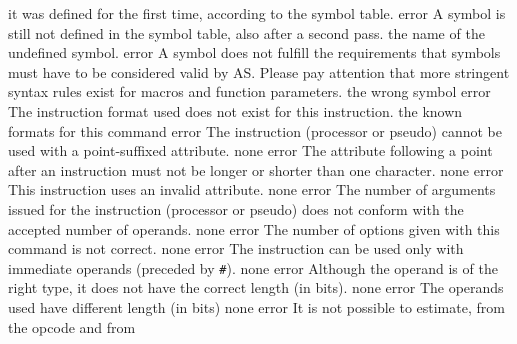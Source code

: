 \documentclass[12pt,twoside]{report}
\newcommand{\tty}[1]{{\tt #1}}
\begin{document}
\begin{description}
{                it was defined for the first time, according to the symbol
                table.}
               {error}
               {A symbol is still not defined in the symbol table, also
                after a second pass.}
               {the name of the undefined symbol.}
               {error}
               {A symbol does not fulfill the requirements that symbols
                must have to be considered valid by AS. Please pay
                attention that more stringent syntax rules exist for
                macros and function parameters.}
               {the wrong symbol}
               {error}
               {The instruction format used does not exist for this
                instruction.}
               {the known formats for this command}
               {error}
               {The instruction (processor or pseudo) cannot be used with a
                point-suffixed attribute.}
               {none}
               {error}
               {The attribute following a point after an instruction must
                not be longer or shorter than one character.}
               {none}
               {error}
               {This instruction uses an invalid attribute.}
               {none}
               {error}
               {The number of arguments issued for the instruction (processor or
                pseudo) does not conform with the accepted number of
                operands.}
               {none}
               {error}
               {The number of options given with this command is not
                correct.}
               {none}
               {error}
               {The instruction can be used only with immediate operands
                (preceded by \tty{\#}).}
               {none}
               {error}
               {Although the operand is of the right type, it does not have
                the correct length (in bits).}
               {none}
               {error}
               {The operands used have different length (in bits)}
               {none}
               {error}
               {It is not possible to estimate, from the opcode and from
}
\end{description}
\end{document}
